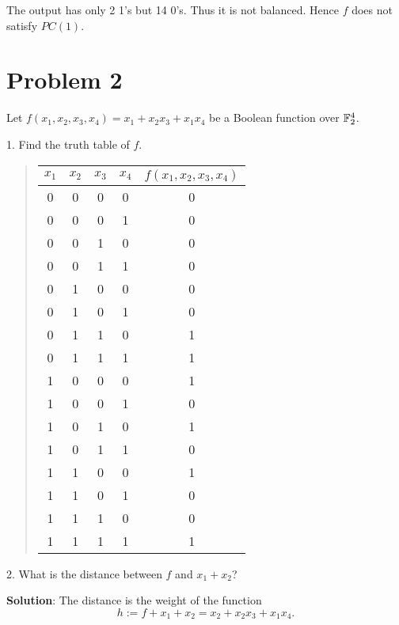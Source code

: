\documentclass[12pt]{article}
\theoremstyle{plain}
\begin{document}
The output has only 2 1's but 14 0's. Thus it is not balanced. Hence $f$ does not satisfy $PC(1)$.

\section{Problem 2}
Let $f(x_1, x_2, x_3, x_4) = x_1 + x_2x_3 + x_1x_4$ be a Boolean function over $\mathbb{F}_2^4$.

1. Find the truth table of $f$.

\begin{quote}
\begin{tabular}{c c c c| c }
$x_1$ & $x_2$ & $x_3$ & $x_4$ & $f(x_1, x_2, x_3, x_4)$ \\
\hline
0 & 0 & 0 & 0 & 0 \\
0 & 0 & 0 & 1 & 0 \\
0 & 0 & 1 & 0 & 0 \\
0 & 0 & 1 & 1 & 0 \\
0 & 1 & 0 & 0 & 0 \\
0 & 1 & 0 & 1 & 0 \\
0 & 1 & 1 & 0 & 1 \\
0 & 1 & 1 & 1 & 1 \\
1 & 0 & 0 & 0 & 1 \\
1 & 0 & 0 & 1 & 0 \\
1 & 0 & 1 & 0 & 1 \\
1 & 0 & 1 & 1 & 0 \\
1 & 1 & 0 & 0 & 1 \\
1 & 1 & 0 & 1 & 0 \\
1 & 1 & 1 & 0 & 0 \\
1 & 1 & 1 & 1 & 1 \\
\end{tabular}
\end{quote}

2. What is the distance between $f$ and $x_1 + x_2$?

{\bf Solution}: The distance is the weight of the function
$$h := f+x_1 + x_2 = x_2 + x_2x_3 + x_1x_4.$$
\end{document}
